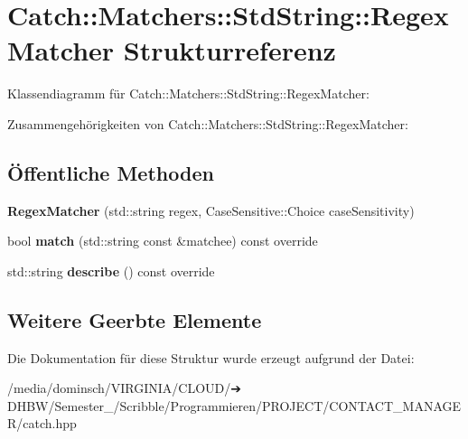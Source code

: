 \hypertarget{structCatch_1_1Matchers_1_1StdString_1_1RegexMatcher}{}\section{Catch\+:\+:Matchers\+:\+:Std\+String\+:\+:Regex\+Matcher Strukturreferenz}
\label{structCatch_1_1Matchers_1_1StdString_1_1RegexMatcher}


Klassendiagramm für Catch\+:\+:Matchers\+:\+:Std\+String\+:\+:Regex\+Matcher\+:


Zusammengehörigkeiten von Catch\+:\+:Matchers\+:\+:Std\+String\+:\+:Regex\+Matcher\+:
\subsection*{Öffentliche Methoden}
\begin{DoxyCompactItemize}
\item 
\mbox{\label{structCatch_1_1Matchers_1_1StdString_1_1RegexMatcher_ab914deb885fe25558c41ab368c6b3916}} 
{\bfseries Regex\+Matcher} (std\+::string regex, Case\+Sensitive\+::\+Choice case\+Sensitivity)
\item 
\mbox{\label{structCatch_1_1Matchers_1_1StdString_1_1RegexMatcher_aa8e61adccabb2f36133029301f6b8f4e}} 
bool {\bfseries match} (std\+::string const \&matchee) const override
\item 
\mbox{\label{structCatch_1_1Matchers_1_1StdString_1_1RegexMatcher_a1f788cd5258c987e5043f6c7f43adeb9}} 
std\+::string {\bfseries describe} () const override
\end{DoxyCompactItemize}
\subsection*{Weitere Geerbte Elemente}


Die Dokumentation für diese Struktur wurde erzeugt aufgrund der Datei\+:\begin{DoxyCompactItemize}
\item 
/media/dominsch/\+V\+I\+R\+G\+I\+N\+I\+A/\+C\+L\+O\+U\+D/➔ D\+H\+B\+W/\+Semester\+\_/\+Scribble/\+Programmieren/\+P\+R\+O\+J\+E\+C\+T/\+C\+O\+N\+T\+A\+C\+T\+\_\+\+M\+A\+N\+A\+G\+E\+R/catch.\+hpp\end{DoxyCompactItemize}
